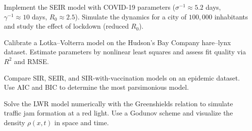 \begin{exercise}
Implement the SEIR model with COVID-19 parameters
($\sigma^{-1} \approx 5.2$ days, $\gamma^{-1} \approx 10$ days,
$R_0 \approx 2.5$). Simulate the dynamics for a city of $100{,}000$
inhabitants and study the effect of lockdown (reduced $R_0$).
\end{exercise}

\begin{exercise}
Calibrate a Lotka--Volterra model on the Hudson's Bay Company
hare--lynx dataset. Estimate parameters by nonlinear least squares
and assess fit quality via $R^2$ and RMSE.
\end{exercise}

\begin{exercise}
Compare SIR, SEIR, and SIR-with-vaccination models on an epidemic
dataset. Use AIC and BIC to determine the most parsimonious model.
\end{exercise}

\begin{exercise}
Solve the LWR model numerically with the Greenshields relation to
simulate traffic jam formation at a red light. Use a Godunov
scheme and visualize the density
$\rho(x,t)$ in space and time.
\end{exercise}
